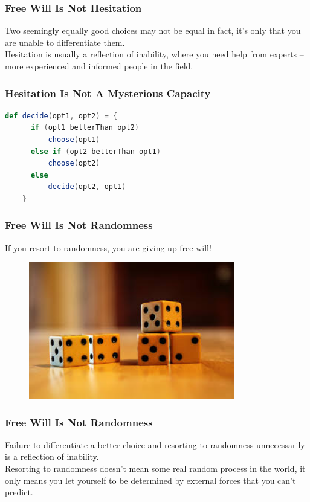\documentclass[xcolor=dvipsnames]{beamer}
\theoremstyle{definition}
\begin{document}
\begin{frame}[fragile]
  \frametitle{Free Will Is Not Hesitation}
  Two seemingly equally good choices may not be equal in fact, it's only that you are unable to differentiate them.\\[0.5cm]

  Hesitation is usually a reflection of \alert{inability}, where you need help from experts -- more experienced and informed people in the field.
\end{frame}

\begin{frame}[fragile]
  \frametitle{Hesitation Is Not A Mysterious Capacity}

  \begin{lstlisting}[language=Scala]
    def decide(opt1, opt2) = {
      if (opt1 betterThan opt2)
          choose(opt1)
      else if (opt2 betterThan opt1)
          choose(opt2)
      else
          decide(opt2, opt1)
    }
  \end{lstlisting}
\end{frame}

\begin{frame}[fragile]
  \frametitle{Free Will Is Not Randomness}
  If you resort to randomness, you are giving up free will!

  \begin{figure}
    \centering
    \includegraphics[width=0.8\textwidth]{images/dice.jpg}\\
  \end{figure}
\end{frame}

\begin{frame}[fragile]
  \frametitle{Free Will Is Not Randomness}
  Failure to differentiate a better choice and resorting to randomness \alert{unnecessarily} is a reflection of \alert{inability}.\\[0.3cm]

  Resorting to randomness doesn't mean some real random process in the world, it only means you let yourself to be determined by external forces that you can't predict.
\end{frame}
\end{document}
